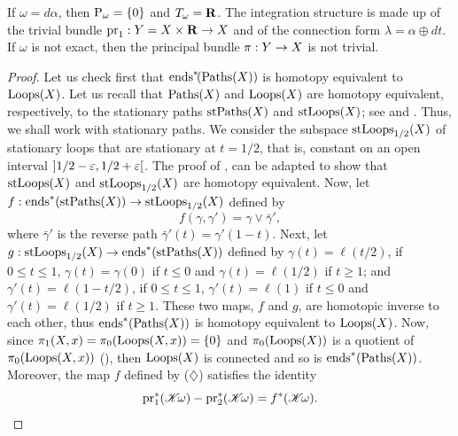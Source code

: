 \begin{article}
   If $\omega = d\alpha$, then ${\operatorname{P}}_\omega = \{0\}$ and $T_\omega = {\mathbf R}$.
  The integration structure is made up of the trivial bundle $\mathrm{pr}_1 : Y = X \times {\mathbf R} \to X$ and of the connection form $\lambda = \alpha \oplus dt$.
  If $\omega$ is not exact,
  then the principal bundle $\pi : Y \to X$ is not trivial.
\end{article} %

\begin{proof}
  Let us check first that $\operatorname{ends}^*\!(\operatorname{Paths}(X))$ is homotopy equivalent to $\operatorname{Loops}(X)$.
  Let us recall that $\operatorname{Paths}(X)$ and $\operatorname{Loops}(X)$ are homotopy  equivalent,
  respectively,
  to the stationary paths $\operatorname{stPaths}(X)$ and $\operatorname{stLoops}(X)$;
  see  and .
  Thus,
  we shall work with stationary paths.
  We consider the subspace $\operatorname{stLoops}_{1/2}(X)$ of stationary loops that are stationary at $t = 1/2$,
  that is,
  constant on an open interval $\left] 1/2 -\varepsilon,1/2+\varepsilon \right[$.
  The proof of ,
  can be adapted to show that $\operatorname{stLoops}(X)$ and $\operatorname{stLoops}_{1/2}(X)$ are homotopy equivalent.
  Now,
  let $f : \operatorname{ends}^*(\operatorname{stPaths}(X)) \to \operatorname{stLoops}_{1/2}(X)$ defined by
  \begin{equation}
    \renewcommand{\theequation}{$\diamondsuit$}
    f(\gamma,\gamma') = \gamma \vee \bar\gamma',
  \end{equation}
  where $\bar\gamma'$ is the reverse path $\bar\gamma'(t) = \gamma'(1-t)$.
  Next,
  let $g : \operatorname{stLoops}_{1/2}(X) \to \operatorname{ends}^*(\operatorname{stPaths}(X))$ defined by $\gamma(t) =\ell(t/2)$,
  if $0 \leq t \leq 1$,
  $\gamma(t) = \gamma(0)$ if $t\leq 0$ and $\gamma(t) = \ell(1/2)$ if $t\geq 1$;
  and $\gamma'(t) = \ell(1-t/2)$,
  if $0 \leq t \leq 1$,
  $\gamma'(t) = \ell(1)$ if $t\leq 0$ and $\gamma'(t) = \ell(1/2)$ if $t\geq 1$.
  These two maps,
  $f$ and $g$,
  are homotopic inverse to each other,
  thus $\operatorname{ends}^*(\operatorname{Paths}(X))$ is homotopy equivalent to $\operatorname{Loops}(X)$.
  Now,
  since $\pi_1(X,x) = \pi_0(\operatorname{Loops}(X,x)) = \{0\}$ and $\pi_0(\operatorname{Loops}(X))$ is a quotient of $\pi_0(\operatorname{Loops}(X,x))$ (),
  then $\operatorname{Loops}(X)$ is connected and so is $\operatorname{ends}^*(\operatorname{Paths}(X))$.
  Moreover,
  the map $f$ defined by ($\diamondsuit$) satisfies the identity
  \begin{equation}
    \renewcommand{\theequation}{$\star$}
    \pr_1^*(\CHK\!\omega) - \pr_2^*(\CHK\!\omega) = f^*(\CHK\!\omega).
  \end{equation}

\end{proof}
